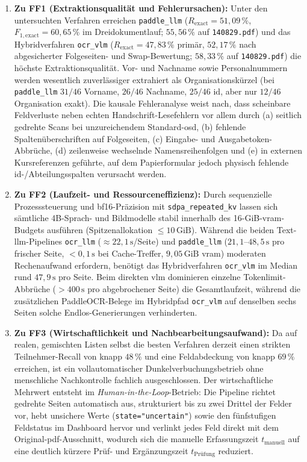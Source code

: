 \begin{enumerate}
  \item \textbf{Zu FF1 (Extraktionsqualität und Fehlerursachen):} Unter den untersuchten Verfahren erreichen \texttt{paddle\_llm} ($R_{\mathrm{exact}} = 51{,}09\,\%$, $F_{1,\mathrm{exact}} = 60{,}65\,\%$ im Dreidokumentlauf; $55{,}56\,\%$ auf \texttt{140829.pdf}) und das Hybridverfahren \texttt{ocr\_vlm} ($R_{\mathrm{exact}} = 47{,}83\,\%$ primär, $52{,}17\,\%$ nach abgesicherter Folgeseiten- und Swap-Bewertung; $58{,}33\,\%$ auf \texttt{140829.pdf}) die höchste Extraktionsqualität. Vor- und Nachname sowie Personalnummern werden wesentlich zuverlässiger extrahiert als Organisationskürzel (bei \texttt{paddle\_llm} $31/46$ Vorname, $26/46$ Nachname, $25/46$ \ac{id}, aber nur $12/46$ Organisation exakt). Die kausale Fehleranalyse weist nach, dass scheinbare Feldverluste neben echten Handschrift-Lesefehlern vor allem durch (a) seitlich gedrehte Scans bei unzureichendem Standard-\ac{osd}, (b) fehlende Spaltenüberschriften auf Folgeseiten, (c) Eingabe- und Ausgabetoken-Abbrüche, (d) zeilenweise wechselnde Namensreihenfolgen und (e) in externen Kursreferenzen geführte, auf dem Papierformular jedoch physisch fehlende \ac{id}-/Abteilungsspalten verursacht werden.
  \item \textbf{Zu FF2 (Laufzeit- und Ressourceneffizienz):} Durch sequenzielle Prozesssteuerung und \ac{bf16}-Präzision mit \texttt{sdpa\_repeated\_kv} lassen sich sämtliche 4B-Sprach- und Bildmodelle stabil innerhalb des \mbox{16-GiB}-\ac{vram}-Budgets ausführen (Spitzenallokation $\le 10\,\text{GiB}$). Während die beiden Text-\ac{llm}-Pipelines \texttt{ocr\_llm} ($\approx 22{,}1\,\mathrm{s}$/Seite) und \texttt{paddle\_llm} ($21{,}1$--$48{,}5\,\mathrm{s}$ pro frischer Seite, $< 0{,}1\,\mathrm{s}$ bei Cache-Treffer, $9{,}05\,\text{GiB}$ \ac{vram}) moderaten Rechenaufwand erfordern, benötigt das Hybridverfahren \texttt{ocr\_vlm} im Median rund $47{,}9\,\mathrm{s}$ pro Seite. Beim direkten \ac{vlm} dominieren einzelne Tokenlimit-Abbrüche ($> 400\,\mathrm{s}$ pro abgebrochener Seite) die Gesamtlaufzeit, während die zusätzlichen PaddleOCR-Belege im Hybridpfad \texttt{ocr\_vlm} auf denselben sechs Seiten solche Endlos-Generierungen verhinderten.
  \item \textbf{Zu FF3 (Wirtschaftlichkeit und Nachbearbeitungsaufwand):} Da auf realen, gemischten Listen selbst die besten Verfahren derzeit einen strikten Teilnehmer-Recall von knapp $48\,\%$ und eine Feldabdeckung von knapp $69\,\%$ erreichen, ist ein vollautomatischer Dunkelverbuchungsbetrieb ohne menschliche Nachkontrolle fachlich ausgeschlossen. Der wirtschaftliche Mehrwert entsteht im \emph{Human-in-the-Loop}-Betrieb: Die Pipeline richtet gedrehte Seiten automatisch aus, strukturiert bis zu zwei Drittel der Felder vor, hebt unsichere Werte (\texttt{state="uncertain"}) sowie den fünfstufigen Feldstatus im Dashboard hervor und verlinkt jedes Feld direkt mit dem Original-\ac{pdf}-Ausschnitt, wodurch sich die manuelle Erfassungszeit $t_{\text{manuell}}$ auf eine deutlich kürzere Prüf- und Ergänzungszeit $t_{\text{Prüfung}}$ reduziert.

\end{enumerate}
